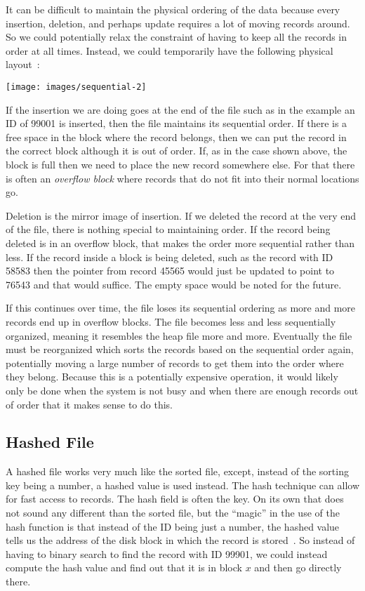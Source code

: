 \documentclass[a4paper]{report}
\begin{document}
It can be difficult to maintain the physical ordering of the data because every insertion, deletion, and perhaps update requires a lot of moving records around. So we could potentially relax the constraint of having to keep all the records in order at all times. Instead, we could temporarily have the following physical layout~\cite{dsc}:

\begin{center}
\texttt{[image: images/sequential-2]}
\end{center}

If the insertion we are doing goes at the end of the file such as in the example an ID of 99001 is inserted, then the file maintains its sequential order. If there is a free space in the block where the record belongs, then we can put the record in the correct block although it is out of order. If, as in the case shown above, the block is full then we need to place the new record somewhere else. For that there is often an \textit{overflow block} where records that do not fit into their normal locations go. 

Deletion is the mirror image of insertion. If we deleted the record at the very end of the file, there is nothing special to maintaining order. If the record being deleted is in an overflow block, that makes the order more sequential rather than less. If the record inside a block is being deleted, such as the record with ID 58583 then the pointer from record 45565 would just be updated to point to 76543 and that would suffice. The empty space would be noted for the future. 

If this continues over time, the file loses its sequential ordering as more and more records end up in overflow blocks. The file becomes less and less sequentially organized, meaning it resembles the heap file more and more. Eventually the file must be reorganized which sorts the records based on the sequential order again, potentially moving a large number of records to get them into the order where they belong. Because this is a potentially expensive operation, it would likely only be done when the system is not busy and when there are enough records out of order that it makes sense to do this. 

\subsection*{Hashed File}

A hashed file works very much like the sorted file, except, instead of the sorting key being a number, a hashed value is used instead. The hash technique can allow for fast access to records. The hash field is often the key. On its own that does not sound any different than the sorted file, but the ``magic'' in the use of the hash function is that instead of the ID being just a number, the hashed value tells us the address of the disk block in which the record is stored~\cite{fds}. So instead of having to binary search to find the record with ID 99901, we could instead compute the hash value and find out that it is in block $x$ and then go directly there.
\end{document}
